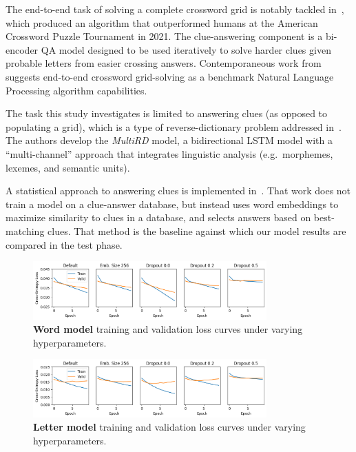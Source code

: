 \documentclass[letterpaper]{article} %
\begin{document}
\begin{NoHyper}
The end-to-end task of solving a complete crossword grid is notably tackled in~\citealp{wallace2022automated},
which produced an algorithm that outperformed humans at the American Crossword Puzzle Tournament in 2021.
The clue-answering component is a bi-encoder QA model designed to be used iteratively to solve harder clues
given probable letters from easier crossing answers.
Contemporaneous work from~\citealp{kulshreshtha2022across} suggests end-to-end crossword grid-solving
as a benchmark Natural Language Processing algorithm capabilities.

The task this study investigates is limited to answering clues (as opposed to populating a grid),
which is a type of reverse-dictionary problem addressed in~\citealp{zhang2019multichannel}.
The authors develop the \textit{MultiRD} model, a bidirectional LSTM model with a ``multi-channel'' approach that
integrates linguistic analysis (e.g.~morphemes, lexemes, and semantic units).

A statistical approach to answering clues is implemented in~\citealp{baselinesolver}.
That work does not train a model on a clue-answer database, but instead uses word embeddings to maximize similarity to
clues in a database, and selects answers based on best-matching clues.
That method is the baseline against which our model results are compared in the test phase.

\begin{figure}
\centering
\includegraphics[width=0.8\textwidth]{fig-onemark-loss-all}
\caption{\textbf{Word model} training and validation loss curves under varying hyperparameters.}
\label{fig:onemark-loss}
\end{figure}

\begin{figure}
\centering
\includegraphics[width=0.8\textwidth]{fig-charmark-loss-all}
\caption{\textbf{Letter model} training and validation loss curves under varying hyperparameters.}
\label{fig:charmark-loss}
\end{figure}


\end{NoHyper}
\end{document}
